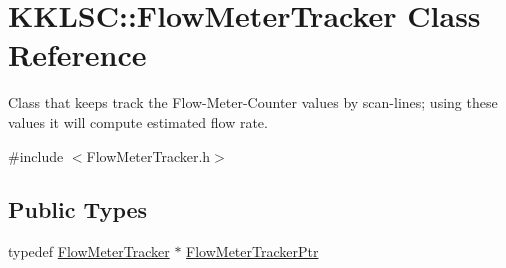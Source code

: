 \hypertarget{class_k_k_l_s_c_1_1_flow_meter_tracker}{}\section{K\+K\+L\+SC\+:\+:Flow\+Meter\+Tracker Class Reference}
\label{class_k_k_l_s_c_1_1_flow_meter_tracker}


Class that keeps track the Flow-\/\+Meter-\/\+Counter values by scan-\/lines; using these values it will compute estimated flow rate.  




{\ttfamily \#include $<$Flow\+Meter\+Tracker.\+h$>$}

\subsection*{Public Types}
\begin{DoxyCompactItemize}
\item 
typedef \hyperlink{class_k_k_l_s_c_1_1_flow_meter_tracker}{Flow\+Meter\+Tracker} $\ast$ \hyperlink{class_k_k_l_s_c_1_1_flow_meter_tracker_a3e157d685c7b8d014283b6aac91c9e13}{Flow\+Meter\+Tracker\+Ptr}
\end{DoxyCompactItemize}
